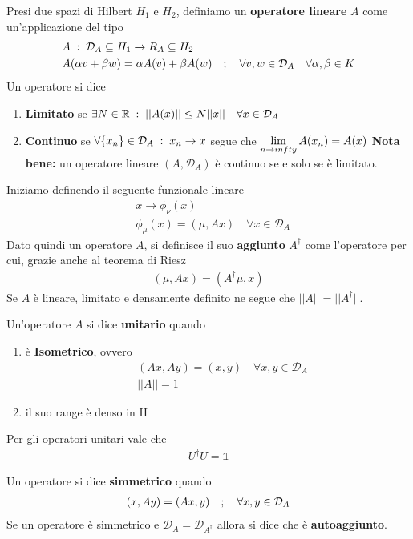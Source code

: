 Presi due spazi di Hilbert $H_1$ e $H_2$, definiamo un \textbf{operatore lineare} $A$ come un'applicazione del tipo
\begin{align}
	&A \; : \; \mathcal{D}_A \subseteq H_1 \rightarrow R_A \subseteq H_2 \\
	&A(\alpha v + \beta w) = \alpha A(v) + \beta A(w) \quad ; \quad \forall v,w \in \mathcal{D}_A \quad \forall \alpha, \beta \in K
\end{align}
Un operatore si dice
\begin{enumerate}
	\item \textbf{Limitato} se $\exists N\in \mathbb{R} \; : \; ||A(x)|| \leq N||x|| \quad \forall x \in \mathcal{D}_A$
	\item \textbf{Continuo} se $\forall \{ x_n\} \in \mathcal{D}_A \; : \; x_n \rightarrow x$ segue che $\underset{n \rightarrow infty}{\lim} \, A(x_n) = A(x)$
	\textbf{Nota bene:} un operatore lineare $(A,\mathcal{D}_A)$ è continuo se e solo se è limitato.
\end{enumerate}

Iniziamo definendo il seguente funzionale lineare
\begin{align}
	&x \rightarrow \phi_\nu(x)\\
	&\phi_\mu(x) = (\mu, Ax) \quad \forall x \in \mathcal{D}_A
\end{align}
Dato quindi un operatore $A$, si definisce il suo \textbf{aggiunto} $A^\dagger$ come l'operatore per cui, grazie anche al teorema di Riesz
\begin{align}
	(\mu, Ax) = (A^\dagger \mu, x)
\end{align}
Se $A$ è lineare, limitato e densamente definito ne segue che $||A|| = ||A^\dagger||$.

Un'operatore $A$ si dice \textbf{unitario} quando
\begin{enumerate}
	\item è \textbf{Isometrico}, ovvero 
	\begin{align}
		&(Ax,Ay) = (x,y) \quad \forall x,y \in \mathcal{D}_A\\
		&||A|| = 1
	\end{align}
	\item il suo range è denso in H
\end{enumerate} 
Per gli operatori unitari vale che
\begin{align}
	U^\dagger U = \mathbb{1}
\end{align}

Un operatore si dice \textbf{simmetrico} quando
\begin{align}
	(x,Ay) = (Ax,y) \quad ; \quad \forall x,y \in \mathcal{D}_A
\end{align}
Se un operatore è simmetrico e $\mathcal{D}_A = \mathcal{D}_{A^\dagger}$ allora si dice che è \textbf{autoaggiunto}.

